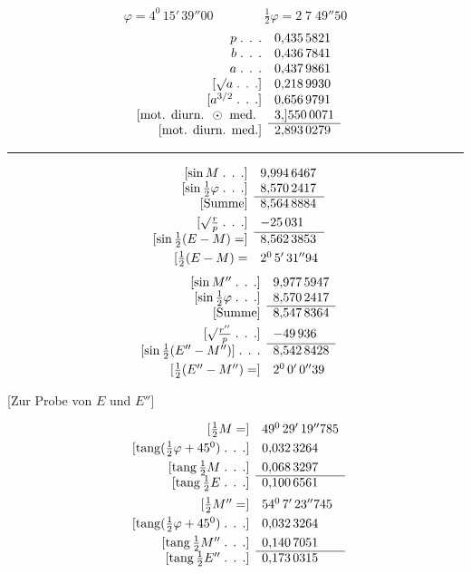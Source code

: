 \begingroup\renewcommand{\thefootnote}{[*)}\footnotetext{Anscheinend nach der Formel $\sin\dfrac12\varphi=\dfrac12\dfrac{\sin\varphi}{\cos\frac12\varphi}$ gerechnet.]}\endgroup
\[
\varphi=4^0\,15'\,39''00\qquad\qquad\tfrac12\varphi=2\;7\;49''50
\]
\[
\begin{array}{rl}
p\;\text{. . .}&0{,}435\,5821\\
b\;\text{. . .}&0{,}436\,7841\\
a\;\text{. . .}&0{,}437\,9861\\
{}[\surd a\;\text{. . .}]&0{,}218\,9930\\
{}[a^{3/2}\;\text{. . .}]&0{,}656\,9791\\
{}[\text{mot. diurn. }\odot\text{ med. }&3{,}]550\,0071\\\cline{2-2}
{}[\text{mot. diurn. med.}]&2{,}893\,0279
\end{array}
\]
\noindent\rule{\linewidth}{.3pt}
\par\noindent{\small [S. 3 u. 10]}
\[
\begin{array}{rl}
{}[\sin M\;\text{. . .}]&9{,}994\,6467\\
{}[\sin\frac12\varphi\;\text{. . .}]&8{,}570\,2417\\\cline{2-2}
{}[\text{Summe}]&8{,}564\,8884\\[3pt]
{}[\surd\frac rp\;\text{. . .}]&-25\,031\\\cline{2-2}
{}[\sin\frac12(E-M)=]&8{,}562\,3853\\[3pt]
{}[\frac12(E-M)=&2^0\,5'\,31''94
\end{array}
\]
\[
\begin{array}{rl}
{}[\sin M''\;\text{. . .}]&9{,}977\,5947\\
{}[\sin\frac12\varphi\;\text{. . .}]&8{,}570\,2417\\\cline{2-2}
{}[\text{Summe}]&8{,}547\,8364\\[3pt]
{}[\surd\frac{r''}p\;\text{. . .}]&-49\,936\\\cline{2-2}
{}[\sin\frac12(E''-M'')]\;\text{. . .}&8{,}542\,8428\\[3pt]
{}[\frac12(E''-M'')=]&2^0\,0'\,0''39
\end{array}
\]
\begin{center}[Zur Probe von $E$ und $E''$]\end{center}
\[
\begin{array}{rl}
{}[\frac12M=]&49^0\,29'\,19''785\\[3pt]
{}[\operatorname{tang}(\frac12\varphi+45^0)\;\text{. . .}]&0{,}032\,3264\\[3pt]
{}[\operatorname{tang}\frac12M\;\text{. . .}]&0{,}068\,3297\\\cline{2-2}
{}[\operatorname{tang}\frac12E\;\text{. . .}]&0{,}100\,6561\\[5pt]
{}[\frac12M''=]&54^0\,7'\,23''745\\[3pt]
{}[\operatorname{tang}(\frac12\varphi+45^0)\;\text{. . .}]&0{,}032\,3264\\[3pt]
{}[\operatorname{tang}\frac12M''\;\text{. . .}]&0{,}140\,7051\\\cline{2-2}
{}[\operatorname{tang}\frac12E''\;\text{. . .}]&0{,}173\,0315
\end{array}
\]
